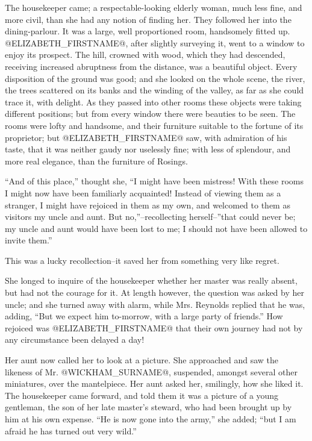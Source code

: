 The housekeeper came; a respectable-looking elderly woman, much less
fine, and more civil, than she had any notion of finding her. They
followed her into the dining-parlour. It was a large, well proportioned
room, handsomely fitted up. @ELIZABETH_FIRSTNAME@, after slightly surveying it, went
to a window to enjoy its prospect. The hill, crowned with wood, which
they had descended, receiving increased abruptness from the distance,
was a beautiful object. Every disposition of the ground was good; and
she looked on the whole scene, the river, the trees scattered on its
banks and the winding of the valley, as far as she could trace it,
with delight. As they passed into other rooms these objects were taking
different positions; but from every window there were beauties to be
seen. The rooms were lofty and handsome, and their furniture suitable to
the fortune of its proprietor; but @ELIZABETH_FIRSTNAME@ saw, with admiration of
his taste, that it was neither gaudy nor uselessly fine; with less of
splendour, and more real elegance, than the furniture of Rosings.

``And of this place,'' thought she, ``I might have been mistress! With
these rooms I might now have been familiarly acquainted! Instead of
viewing them as a stranger, I might have rejoiced in them as my own, and
welcomed to them as visitors my uncle and aunt. But no,''--recollecting
herself--''that could never be; my uncle and aunt would have been lost to
me; I should not have been allowed to invite them.''

This was a lucky recollection--it saved her from something very like
regret.

She longed to inquire of the housekeeper whether her master was really
absent, but had not the courage for it. At length however, the question
was asked by her uncle; and she turned away with alarm, while Mrs.
Reynolds replied that he was, adding, ``But we expect him to-morrow, with
a large party of friends.'' How rejoiced was @ELIZABETH_FIRSTNAME@ that their own
journey had not by any circumstance been delayed a day!

Her aunt now called her to look at a picture. She approached and saw the
likeness of Mr. @WICKHAM_SURNAME@, suspended, amongst several other miniatures,
over the mantelpiece. Her aunt asked her, smilingly, how she liked it.
The housekeeper came forward, and told them it was a picture of a young
gentleman, the son of her late master's steward, who had been brought
up by him at his own expense. ``He is now gone into the army,'' she added;
``but I am afraid he has turned out very wild.''

